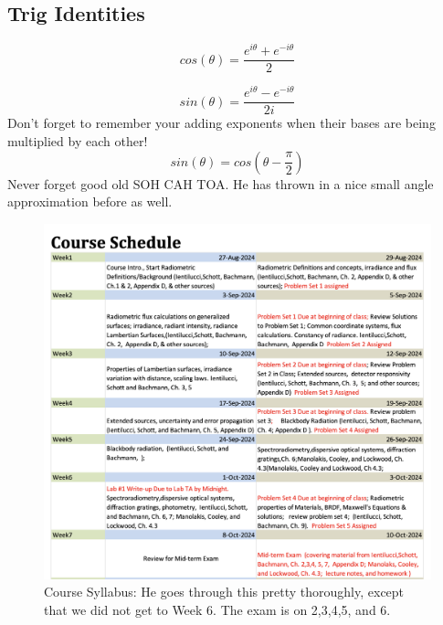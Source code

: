 \documentclass{article}
\begin{document}







\subsection{Trig Identities}
\begin{equation}
    cos(\theta)= \frac{e^{i \theta}+e^{-i \theta}}{2}
\end{equation}

\begin{equation}
    sin(\theta)= \frac{e^{i \theta}-e^{-i \theta}}{2i}
\end{equation}
Don't forget to remember your adding exponents when their bases are being multiplied by each other!
\begin{equation}
    sin(\theta)= cos(\theta - \frac{\pi}{2}) 
\end{equation}
Never forget good old SOH CAH TOA. 
He has thrown in a nice small angle approximation before as well. 

\begin{figure}[h!]
\centering
\includegraphics[scale=.95]{Radiometry/Week1/Notes/Syllabus.png}
\caption{Course Syllabus: He goes through this pretty thoroughly, except that we did not get to Week 6. The exam is on 2,3,4,5, and 6.}
\label{fig:Snowman3}
\end{figure}
\end{document}
